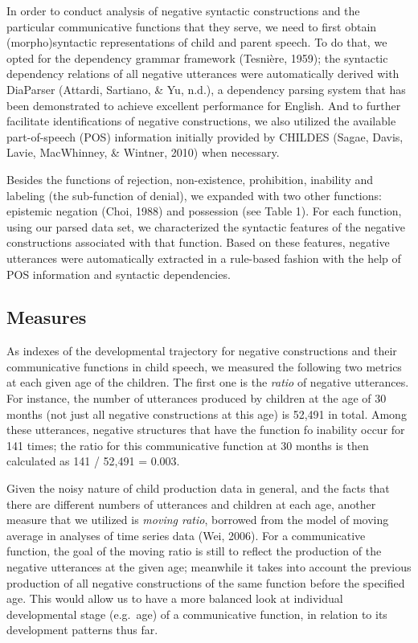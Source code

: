 \documentclass[10pt, letterpaper]{article}
\begin{document}
In order to conduct analysis of negative syntactic constructions and the
particular communicative functions that they serve, we need to first
obtain (morpho)syntactic representations of child and parent speech. To
do that, we opted for the dependency grammar framework (Tesnière, 1959);
the syntactic dependency relations of all negative utterances were
automatically derived with DiaParser (Attardi, Sartiano, \& Yu, n.d.), a
dependency parsing system that has been demonstrated to achieve
excellent performance for English. And to further facilitate
identifications of negative constructions, we also utilized the
available part-of-speech (POS) information initially provided by CHILDES
(Sagae, Davis, Lavie, MacWhinney, \& Wintner, 2010) when necessary.

Besides the functions of rejection, non-existence, prohibition,
inability and labeling (the sub-function of denial), we expanded with
two other functions: epistemic negation (Choi, 1988) and possession (see
Table 1). For each function, using our parsed data set, we characterized
the syntactic features of the negative constructions associated with
that function. Based on these features, negative utterances were
automatically extracted in a rule-based fashion with the help of POS
information and syntactic dependencies.

\hypertarget{measures}{%
\subsection{Measures}\label{measures}}

As indexes of the developmental trajectory for negative constructions
and their communicative functions in child speech, we measured the
following two metrics at each given age of the children. The first one
is the \emph{ratio} of negative utterances. For instance, the number of
utterances produced by children at the age of 30 months (not just all
negative constructions at this age) is 52,491 in total. Among these
utterances, negative structures that have the function fo inability
occur for 141 times; the ratio for this communicative function at 30
months is then calculated as 141 / 52,491 = 0.003.

Given the noisy nature of child production data in general, and the
facts that there are different numbers of utterances and children at
each age, another measure that we utilized is \emph{moving ratio},
borrowed from the model of moving average in analyses of time series
data (Wei, 2006). For a communicative function, the goal of the moving
ratio is still to reflect the production of the negative utterances at
the given age; meanwhile it takes into account the previous production
of all negative constructions of the same function before the specified
age. This would allow us to have a more balanced look at individual
developmental stage (e.g.~age) of a communicative function, in relation
to its development patterns thus far.
\end{document}
